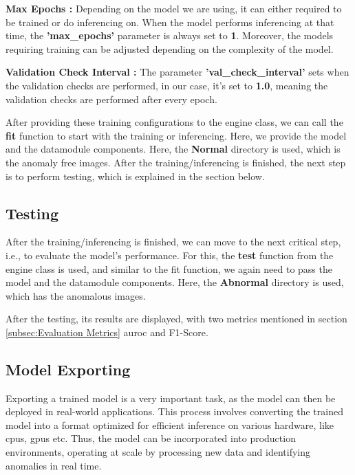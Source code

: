 \textbf{Max Epochs :} Depending on the model we are using, it can either required to be trained or do inferencing on. When the model performs inferencing at that time, the \textbf{'max\_epochs'} parameter is always set to \textbf{1}. Moreover, the models requiring training can be adjusted depending on the complexity of the model.%

\textbf{Validation Check Interval :} The parameter \textbf{'val\_check\_interval'} sets when the validation checks are performed, in our case, it's set to \textbf{1.0}, meaning the validation checks are performed after every epoch.

After providing these training configurations to the engine class, we can call the \textbf{fit} function to start with the training or inferencing. Here, we provide the model and the datamodule components. Here, the \textbf{Normal} directory is used, which is the anomaly free images. After the training/inferencing is finished, the next step is to perform testing, which is explained in the section below.

\subsection{Testing}

After the training/inferencing is finished, we can move to the next critical step, i.e., to evaluate the model's performance. For this, the \textbf{test} function from the engine class is used, and similar to the fit function, we again need to pass the model and the datamodule components. Here, the \textbf{Abnormal} directory is used, which has the anomalous images. 

After the testing, its results are displayed, with two metrics mentioned in section \ref{subsec:Evaluation Metrics} \gls{auroc} and F1-Score.

\subsection{Model Exporting}
\label{subsec:Model Exporting}

Exporting a trained model is a very important task, as the model can then be deployed in real-world applications. This process involves converting the trained model into a format optimized for efficient inference on various hardware, like \glspl{cpu}, \glspl{gpu} etc. Thus, the model can be incorporated into production environments, operating at scale by processing new data and identifying anomalies in real time.

